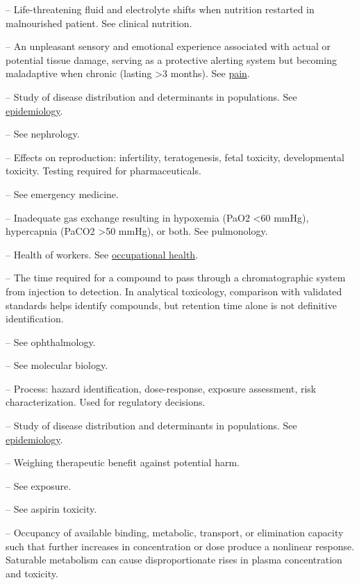 -- Life-threatening fluid and electrolyte shifts when nutrition restarted in malnourished patient. See clinical nutrition.

-- An unpleasant sensory and emotional experience associated with actual or potential tissue damage, serving as a protective alerting system but becoming maladaptive when chronic (lasting >3 months). See \hyperlink{Pain}{pain}.

-- Study of disease distribution and determinants in populations. See \hyperlink{Epidemiology}{epidemiology}.

-- See nephrology.

-- Effects on reproduction: infertility, teratogenesis, fetal toxicity, developmental toxicity. Testing required for pharmaceuticals.

-- See emergency medicine.

-- Inadequate gas exchange resulting in hypoxemia (PaO2 <60 mmHg), hypercapnia (PaCO2 >50 mmHg), or both. See pulmonology.

-- Health of workers. See \hyperlink{Occupational Health}{occupational health}.

-- The time required for a compound to pass through a chromatographic system from injection to detection. In analytical toxicology, comparison with validated standards helps identify compounds, but retention time alone is not definitive identification.

-- See ophthalmology.


-- See molecular biology.

-- Process: hazard identification, dose-response, exposure assessment, risk characterization. Used for regulatory decisions.

-- Study of disease distribution and determinants in populations. See \hyperlink{Epidemiology}{epidemiology}.

-- Weighing therapeutic benefit against potential harm.

-- See exposure.

-- See aspirin toxicity.


-- Occupancy of available binding, metabolic, transport, or elimination capacity such that further increases in concentration or dose produce a nonlinear response. Saturable metabolism can cause disproportionate rises in plasma concentration and toxicity.

